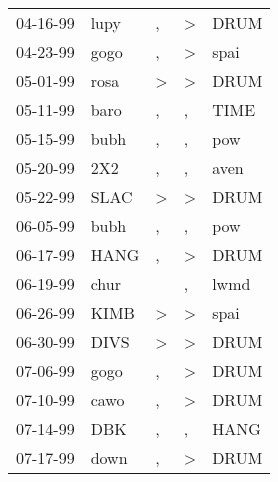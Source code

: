 \begin{supertabular}{p{0.07\textwidth}p{0.06\textwidth}p{0.02\textwidth}p{0.02\textwidth}p{0.06\textwidth}}
 04-16-99\textsuperscript{} &           lupy\textsuperscript{} &             , &  \textgreater &  DRUM\textsuperscript{} \\
 04-23-99\textsuperscript{} &           gogo\textsuperscript{} &             , &  \textgreater &  spai\textsuperscript{} \\
 05-01-99\textsuperscript{} &           rosa\textsuperscript{} &  \textgreater &  \textgreater &  DRUM\textsuperscript{} \\
 05-11-99\textsuperscript{} &           baro\textsuperscript{} &             , &             , &  TIME\textsuperscript{} \\
 05-15-99\textsuperscript{} &           bubh\textsuperscript{} &             , &             , &   pow\textsuperscript{} \\
 05-20-99\textsuperscript{} &            2X2\textsuperscript{} &             , &             , &  aven\textsuperscript{} \\
 05-22-99\textsuperscript{} &           SLAC\textsuperscript{} &  \textgreater &  \textgreater &  DRUM\textsuperscript{} \\
 06-05-99\textsuperscript{} &           bubh\textsuperscript{} &             , &             , &   pow\textsuperscript{} \\
 06-17-99\textsuperscript{} &           HANG\textsuperscript{} &             , &  \textgreater &  DRUM\textsuperscript{} \\
 06-19-99\textsuperscript{} &           chur\textsuperscript{} &               &             , &  lwmd\textsuperscript{} \\
 06-26-99\textsuperscript{} &           KIMB\textsuperscript{} &  \textgreater &  \textgreater &  spai\textsuperscript{} \\
 06-30-99\textsuperscript{} &           DIVS\textsuperscript{} &  \textgreater &  \textgreater &  DRUM\textsuperscript{} \\
 07-06-99\textsuperscript{} &           gogo\textsuperscript{} &             , &  \textgreater &  DRUM\textsuperscript{} \\
 07-10-99\textsuperscript{} &           cawo\textsuperscript{} &             , &  \textgreater &  DRUM\textsuperscript{} \\
 07-14-99\textsuperscript{} &            DBK\textsuperscript{} &             , &             , &  HANG\textsuperscript{} \\
 07-17-99\textsuperscript{} &           down\textsuperscript{} &             , &  \textgreater &  DRUM\textsuperscript{} \\

\end{supertabular}

